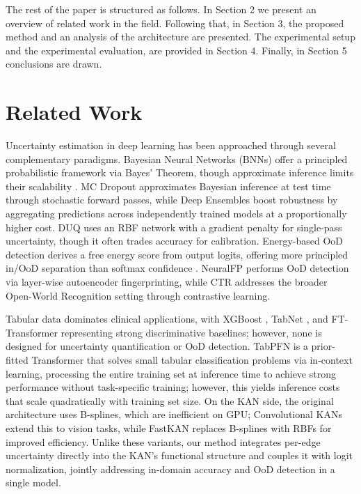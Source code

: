 \documentclass[conference]{IEEEtran}
\begin{document}
The rest of the paper is structured as follows. In Section 2 we present an overview of related work in the field. Following that, in Section 3, the proposed method and an analysis of the architecture are presented. The experimental setup and the experimental evaluation, are provided in Section 4. Finally, in Section 5 conclusions are drawn.

\section{Related Work}


Uncertainty estimation in deep learning has been approached through several complementary paradigms. Bayesian Neural Networks (BNNs) \cite{Goan_2020} offer a principled probabilistic framework via Bayes' Theorem, though approximate inference limits their scalability \cite{gal2016dropoutbayesianapproximationrepresenting}. MC Dropout \cite{gal2016dropoutbayesianapproximationrepresenting} approximates Bayesian inference at test time through stochastic forward passes, while Deep Ensembles \cite{lakshminarayanan2017simplescalablepredictiveuncertainty} boost robustness by aggregating predictions across independently trained models at a proportionally higher cost. DUQ \cite{vanamersfoort2020uncertaintyestimationusingsingle} uses an RBF network with a gradient penalty for single-pass uncertainty, though it often trades accuracy for calibration. Energy-based OoD detection \cite{liu2020energy} derives a free energy score from output logits, offering more principled in/OoD separation than softmax confidence \cite{10.1007/978-3-031-78201-5_4}. NeuralFP \cite{9412489} performs OoD detection via layer-wise autoencoder fingerprinting, while CTR \cite{9956206} addresses the broader Open-World Recognition setting through contrastive learning.

Tabular data dominates clinical applications, with XGBoost \cite{chen2016xgboost}, TabNet \cite{arik2021tabnet}, and FT-Transformer \cite{gorishniy2021revisiting} representing strong discriminative baselines; however, none is designed for uncertainty quantification or OoD detection. TabPFN \cite{hollmann2023tabpfn} is a prior-fitted Transformer that solves small tabular classification problems via in-context learning, processing the entire training set at inference time to achieve strong performance without task-specific training; however, this yields inference costs that scale quadratically with training set size. On the KAN side, the original architecture \cite{liu2025kankolmogorovarnoldnetworks} uses B-splines, which are inefficient on GPU; Convolutional KANs \cite{bodner2025convolutionalkolmogorovarnoldnetworks} extend this to vision tasks, while FastKAN \cite{li2024kolmogorovarnoldnetworksradialbasis} replaces B-splines with RBFs for improved efficiency. Unlike these variants, our method integrates per-edge uncertainty directly into the KAN's functional structure and couples it with logit normalization, jointly addressing in-domain accuracy and OoD detection in a single model.
\end{document}
